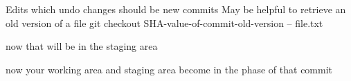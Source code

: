 Edits which undo changes should be new commits 
May be helpful to retrieve an old version of a file 
  git checkout SHA-value-of-commit-old-version -- file.txt 

  now that will be in the staging area 

  now your working area and staging area become in the phase of that commit 
     